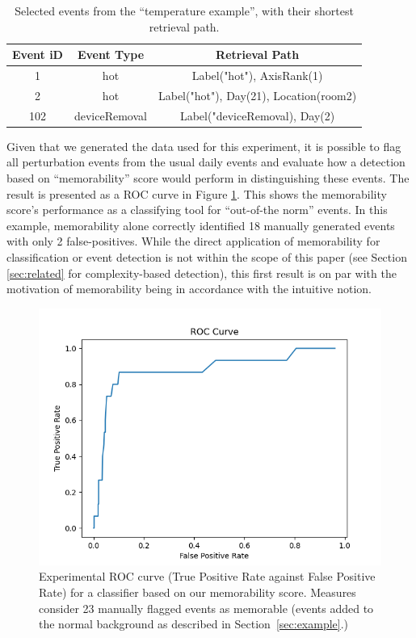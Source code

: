 \documentclass[entropy,article,submit,moreauthors,pdftex]{Definitions/mdpi}
\begin{document}
\begin{table}
    \centering
    \begin{tabular}{c|c|c}
        Event iD & Event Type    & Retrieval Path                         \\
        \hline
        1        & hot           & Label("hot"), AxisRank(1)              \\
        2        & hot           & Label("hot"), Day(21), Location(room2) \\
        102      & deviceRemoval & Label("deviceRemoval), Day(2)          \\
    \end{tabular}
    \caption{Selected events from the ``temperature example'', with their shortest retrieval path.}
\end{table}

Given that we generated the data used for this experiment, it is possible to
flag all perturbation events from the usual daily events and evaluate how a
detection based on ``memorability'' score would perform in distinguishing these
events. The result is presented as a ROC curve in Figure \ref{fig:roc}. This shows the memorability score's performance as a classifying tool for ``out-of-the norm'' events. In this example, memorability alone correctly identified 18 manually generated events with only 2 false-positives. While the direct application of memorability for classification or event detection is not within the scope of this paper (see Section \ref{sec:related} for complexity-based detection), this first result is on par with the motivation of memorability being in accordance with the intuitive notion.

\begin{figure}[ht]
    \centering
\includegraphics[width=0.7\linewidth]{./figures/roc}
    \caption{Experimental ROC curve (True Positive Rate against False Positive
Rate) for a classifier based on our memorability score. Measures consider 23
manually flagged events as memorable (events added to the normal background
as described in Section~\ref{sec:example}.)}
    \label{fig:roc}
\end{figure}
\end{document}
